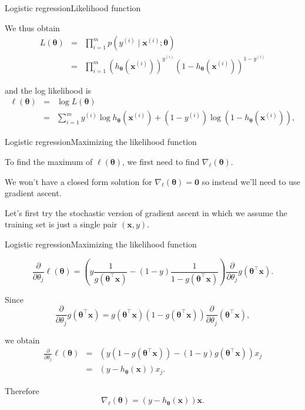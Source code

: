 \documentclass{beamer}
\renewcommand{\vec}[1]{\boldsymbol{#1}}
\begin{document}
\begin{frame}{Logistic regression}{Likelihood function}

  We thus obtain
  \begin{eqnarray}
    L(\vec{\theta}) & = & \prod_{i=1}^m p(y^{(i)} \mid \vec{x}^{(i)} ; \vec{\theta}) \nonumber \\
    & = & \prod_{i=1}^m (h_{\vec{\theta}}(\vec{x}^{(i)}))^{y^{(i)}}(1-h_{\vec{\theta}}(\vec{x}^{(i)}))^{1-y^{(i)}} \nonumber
  \end{eqnarray}

  and the log likelihood is
  \begin{eqnarray}
    \ell(\vec{\theta}) & = & \log L(\vec{\theta}) \nonumber \\
    & = & \sum_{i=1}^m y^{(i)} \log h_{\vec{\theta}}(\vec{x}^{(i)}) + (1-y^{(i)})\log (1-h_{\vec{\theta}}(\vec{x}^{(i)})),
    \nonumber 
  \end{eqnarray}
  
\end{frame}


\begin{frame}{Logistic regression}{Maximizing the likelihood function}

  To find the maximum of $\ell(\vec{\theta})$, we first need to find
  $\nabla_{\ell}(\vec{\theta})$.

  \medskip

  We won't have a closed form solution for
  $\nabla_{\ell}(\vec{\theta}) = \vec{0}$ so instead we'll need to use
  gradient ascent.

  \medskip

  Let's first try the \alert{stochastic} version of gradient ascent in
  which we assume the training set is just a single pair
  $(\vec{x},y)$.

\end{frame}


\begin{frame}{Logistic regression}{Maximizing the likelihood function}

  \[ \frac{\partial}{\partial \theta_j} \ell(\vec{\theta}) =
  \left( y \frac{1}{g(\vec{\theta}^\top \vec{x})} - (1-y)\frac{1}{1-g(\vec{\theta}^\top \vec{x})} \right) \frac{\partial}{\partial \theta_j}g(\vec{\theta}^\top \vec{x}). \]

  Since
  \[ \frac{\partial}{\partial \theta_j}g(\vec{\theta}^\top \vec{x}) =
  g(\vec{\theta}^\top\vec{x})(1-g(\vec{\theta}^\top \vec{x})) \frac{\partial}{\partial \theta_j}(\vec{\theta}^\top \vec{x}), \]

  we obtain
  \begin{eqnarray}
    \frac{\partial}{\partial \theta_j} \ell(\vec{\theta}) & = &
    \left( y (1-g(\vec{\theta}^\top \vec{x})) - (1-y)g(\vec{\theta}^\top \vec{x}) \right) x_j \nonumber \\
    & = & (y-h_{\vec{\theta}}(\vec{x})) x_j .\nonumber
  \end{eqnarray}

  Therefore
  \[ \nabla_\ell(\vec{\theta}) = (y-h_{\vec{\theta}}(\vec{x}))\vec{x}. \]
    
\end{frame}
\end{document}
